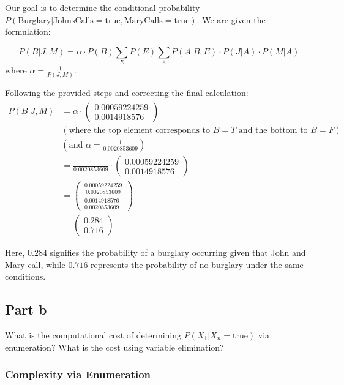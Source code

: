 \documentclass[12pt]{article}
\begin{document}
Our goal is to determine the conditional probability 
$P(\text{Burglary} | \text{JohnsCalls} = \text{true}, \text{MaryCalls} = \text{true})$. 
We are given the formulation:

$$P(B|J, M) = \alpha \cdot P(B) \sum_{E} P(E) \sum_{A} P(A|B, E) \cdot P(J|A) \cdot P(M|A)$$
where 
$\alpha = \frac{1}{P(J, M)}$.

Following the provided steps and correcting the final calculation:
\begin{align*}
P(B|J,M)
& = \alpha \cdot \begin{pmatrix} 0.00059224259 \\ 0.0014918576 \end{pmatrix} \\
& \left( \text{where the top element corresponds to } B=T \text{ and the bottom to } B=F \right) \\
& \left( \text{and } \alpha = \frac{1}{0.0020853609} \right) \\
& = \frac{1}{0.0020853609} \cdot \begin{pmatrix} 0.00059224259 \\ 0.0014918576 \end{pmatrix} \\
& = \begin{pmatrix} \frac{0.00059224259}{0.0020853609} \\ \frac{0.0014918576}{0.0020853609} \end{pmatrix} \\
& = \begin{pmatrix} 0.284 \\ 0.716 \end{pmatrix}
\end{align*}

Here, 
$\boxed{0.284}$ signifies the probability of a burglary occurring given that John and Mary call, 
while $\boxed{0.716}$ represents the probability of no burglary under the same conditions.

\subsection{Part b}

What is the computational cost of determining 
$P(X_1 | X_n = \text{true})$ 
via enumeration? 
What is the cost using variable elimination?

\subsubsection{Complexity via Enumeration}
\end{document}
